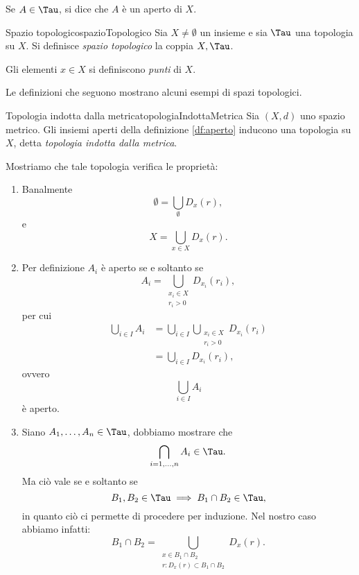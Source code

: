 \begin{notz}
    Se \(A\in \Tau\), si dice che \(A\) è un aperto di \(X\).
\end{notz}

\begin{defn}{Spazio topologico}{spazioTopologico}
    Sia \(X\neq\emptyset\) un insieme e sia \(\Tau\) una topologia su \(X\).
    Si definisce \emph{spazio topologico} la coppia \(X,\Tau\).
\end{defn}

\begin{notz}
    Gli elementi \(x\in X\) si definiscono \emph{punti} di \(X\).
\end{notz}

Le definizioni che seguono mostrano alcuni esempi di spazi topologici.

\begin{defn}{Topologia indotta dalla metrica}{topologiaIndottaMetrica}
    Sia \((X,d)\) uno spazio metrico.
    Gli insiemi aperti della definizione \ref{df:aperto} inducono una topologia su \(X\), detta \emph{topologia indotta dalla metrica}.
\end{defn}

\begin{oss}
    Mostriamo che tale topologia verifica le proprietà:
    \begin{enumerate}
        \item Banalmente
              \[
                  \emptyset =\bigcup_\emptyset D_x(r),
              \]
              e
              \[
                  X=\bigcup_{x\in X}D_x(r).
              \]
        \item Per definizione \(A_i\) è aperto se e soltanto se
              \[
                  A_i=\bigcup_{\substack{x_i\in X\\r_i>0}}D_{x_i}(r_i),
              \]
              per cui
              \[
                  \begin{split}
                      \bigcup_{i\in I}A_i & =\bigcup_{i\in I}\bigcup_{\substack{x_i\in X\\r_i>0}}D_{x_i}(r_i)\\
                      & =\bigcup_{i\in I}D_{x_i}(r_i),
                  \end{split}
              \]
              ovvero
              \[
                  \bigcup_{i\in I}A_i
              \]
              è aperto.
        \item Siano \(A_1,\dots,A_n\in\Tau\), dobbiamo mostrare che
              \[
                  \bigcap_{i=1,\dots,n}A_i\in\Tau.
              \]
              Ma ciò vale se e soltanto se
              \[
                  B_1,B_2\in\Tau\implies B_1\cap B_2\in\Tau,
              \]
              in quanto ciò ci permette di procedere per induzione.
              Nel nostro caso abbiamo infatti:
              \[
                  B_1\cap B_2=\bigcup_{\substack{x\in B_1\cap B_2\\r:D_x(r)\subset B_1\cap B_2}}D_x(r).
              \]
    \end{enumerate}
\end{oss}


